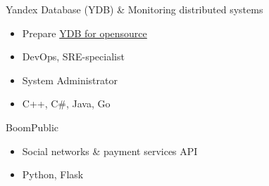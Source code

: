 \documentclass[10pt,a4paper,ragged2e]{altacv}
\begin{document}
Yandex Database (YDB) \& Monitoring distributed systems
\begin{itemize}
    \item Prepare \href{https://github.com/ydb-platform/ydb}{YDB for opensource}
    \item DevOps, SRE-specialist
    \item System Administrator
    \item C++, C\#, Java, Go
\end{itemize}
\bigskip

BoomPublic
\begin{itemize}
    \item Social networks \& payment services API
    \item Python, Flask
\end{itemize}


\end{document}
